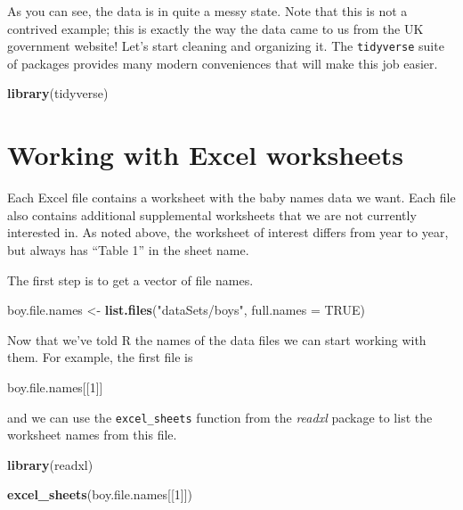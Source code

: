 \documentclass[]{book}
\newenvironment{Shaded}{\begin{snugshade}}{\end{snugshade}}
\newcommand{\KeywordTok}[1]{\textcolor[rgb]{0.13,0.29,0.53}{\textbf{#1}}}
\newcommand{\DataTypeTok}[1]{\textcolor[rgb]{0.13,0.29,0.53}{#1}}
\newcommand{\DecValTok}[1]{\textcolor[rgb]{0.00,0.00,0.81}{#1}}
\newcommand{\StringTok}[1]{\textcolor[rgb]{0.31,0.60,0.02}{#1}}
\newcommand{\OtherTok}[1]{\textcolor[rgb]{0.56,0.35,0.01}{#1}}
\newcommand{\NormalTok}[1]{#1}
\begin{document}
As you can see, the data is in quite a messy state. Note that this is
not a contrived example; this is exactly the way the data came to us
from the UK government website! Let's start cleaning and organizing it.
The \texttt{tidyverse} suite of packages provides many modern
conveniences that will make this job easier.

\begin{Shaded}
\begin{Highlighting}[]
\KeywordTok{library}\NormalTok{(tidyverse)}
\end{Highlighting}
\end{Shaded}

\section{Working with Excel
worksheets}\label{working-with-excel-worksheets}

Each Excel file contains a worksheet with the baby names data we want.
Each file also contains additional supplemental worksheets that we are
not currently interested in. As noted above, the worksheet of interest
differs from year to year, but always has ``Table 1'' in the sheet name.

The first step is to get a vector of file names.

\begin{Shaded}
\begin{Highlighting}[]
\NormalTok{boy.file.names <-}\StringTok{ }\KeywordTok{list.files}\NormalTok{(}\StringTok{"dataSets/boys"}\NormalTok{, }\DataTypeTok{full.names =} \OtherTok{TRUE}\NormalTok{)}
\end{Highlighting}
\end{Shaded}

Now that we've told R the names of the data files we can start working
with them. For example, the first file is

\begin{Shaded}
\begin{Highlighting}[]
\NormalTok{boy.file.names[[}\DecValTok{1}\NormalTok{]]}
\end{Highlighting}
\end{Shaded}

and we can use the \texttt{excel\_sheets} function from the
\emph{readxl} package to list the worksheet names from this file.

\begin{Shaded}
\begin{Highlighting}[]
\KeywordTok{library}\NormalTok{(readxl)}

\KeywordTok{excel_sheets}\NormalTok{(boy.file.names[[}\DecValTok{1}\NormalTok{]])}
\end{Highlighting}
\end{Shaded}
\end{document}
